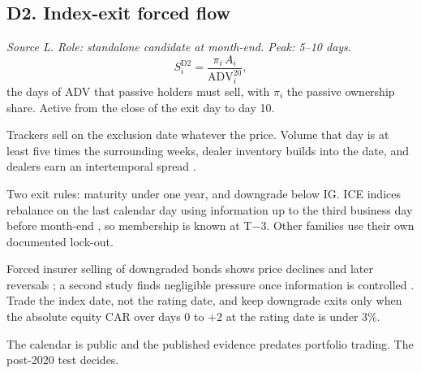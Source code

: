 \documentclass[11pt,letterpaper]{article}
\newcommand{\ADV}{\mathrm{ADV}}
\begin{document}
\subsection{D2. Index-exit forced flow}
\emph{Source L. Role: standalone candidate at month-end. Peak: 5--10 days.}
\begin{equation}
S^{\mathrm{D2}}_{i}=\frac{\pi_i\,A_i}{\ADV^{20}_i},
\end{equation}
the days of ADV that passive holders must sell, with $\pi_i$ the passive ownership share. Active from the close of the exit day to day 10.
\begin{spec}
\item[Mechanism and evidence.] Trackers sell on the exclusion date whatever the price. Volume that day is at least five times the surrounding weeks, dealer inventory builds into the date, and dealers earn an intertemporal spread \cite{dnr2019}.
\item[Build.] Two exit rules: maturity under one year, and downgrade below IG. ICE indices rebalance on the last calendar day using information up to the third business day before month-end \cite{ice}, so membership is known at T$-$3. Other families use their own documented lock-out.
\item[Information confound.] Forced insurer selling of downgraded bonds shows price declines and later reversals \cite{ejl2011}; a second study finds negligible pressure once information is controlled \cite{ach}. Trade the index date, not the rating date, and keep downgrade exits only when the absolute equity CAR over days 0 to $+2$ at the rating date is under 3\%.
\item[Decay and pitfalls.] The calendar is public and the published evidence predates portfolio trading. The post-2020 test decides.
\end{spec}
\end{document}
